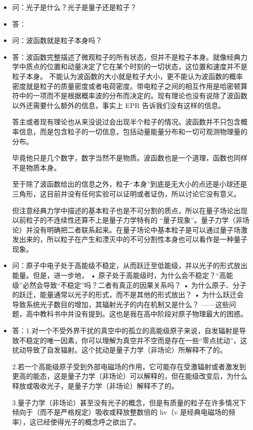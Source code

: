 \begin{itemize}
\item 问：光子是什么？光子是量子还是粒子？
\item 答：

\item 问：波函数就是粒子本身吗？
\item 答：波函数完整描述了微观粒子的所有状态，但并不是粒子本身。就像经典力学中质点的位置和动量决定了它在某个时刻的一切状态，这位置和速度并不是粒子本身。 不能认为波函数的大小就是粒子大小，更不能认为波函数的概率密度就是粒子的质量密度或者电荷密度。带电粒子之间的相互作用是哈密顿算符中的一项而不是根据概率波的分布而决定的。现有理论也没有说除了波函数以外还需要什么额外的信息，事实上 EPR 告诉我们没有这样的信息。

答主或者现有理论也从来没说过会出现半个粒子的情况。波函数并不只包含概率信息，而是包含粒子的一切信息，包括动量能量分布和一切可观测物理量的分布。

毕竟他只是几个数字，数字当然不是物质。波函数也是一个道理，函数也同样不是物质本身。

至于除了波函数给出的信息之外，粒子“本身”到底是无大小的点还是小球还是三角形，这目前并没有任何实验可以证明或者证伪，所以讨论它没有意义。

但注意经典力学中描述的基本粒子也是不可分割的质点，所以在量子场论出现以前粒子的不连续性还算不上是量子力学特有的 “量子现象”。量子力学（非场论）并没有明确把二者联系起来。在量子场论中基本粒子是可以通过量子场激发出来的，所以粒子在产生和湮灭中的不可分割性本身也可以看作是一种量子现象。

\item 问：原子中电子处于高能级不稳定，从而跃迁至低能级，并以光子的形式放出能量。但是，进一步地，
• 原子处于高能级时，为什么会不稳定？“高能级”必然会导致“不稳定”吗？二者有真正的因果关系吗？
• 为什么原子、分子的跃迁，能量通常以光子的形式，而不是其他的形式放出？
• 为什么跃迁会导致系统光子数目的增加，其辐射光子的内在机制又是什么？
——这些问题，高中教科书中并没有提到。这也是我在高中阶段对原子物理最大的困惑。
\item 答：1.对一个不受外界干扰的真空中的孤立的高能级原子来说，自发辐射是导致不稳定的唯一因素，你可以理解为真空并不空而是存在一些“零点扰动”，这扰动导致了自发辐射。这个扰动是量子力学（非场论）所解释不了的。

2.若一个高能级原子受到外部电磁场的作用，它可能存在受激辐射或者激发到更高的能态，这是量子力学（非场论）可以解释的，但在能级改变后，为什么释放或吸收光子，是量子力学（非场论）解释不了的。

3.量子力学（非场论）甚至没有光子的概念，但是有质量的粒子在许多情况下倾向于（而不是严格规定）吸收或释放整数倍的 hv（v 是经典电磁场的频率），这已经使得光子的概念呼之欲出了。


\end{itemize}
